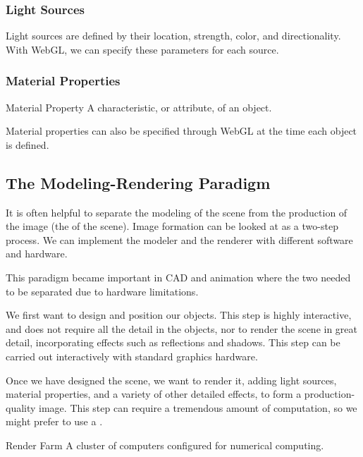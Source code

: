 \documentclass[\main/notes.tex]{subfiles}
\begin{document}
        \subsubsection{Light Sources}
          Light sources are defined by their location, strength, color, and directionality.
          With WebGL, we can specify these parameters for each source.

        \subsubsection{Material Properties}
          \begin{definition}{Material Property}
            A characteristic, or attribute, of an object.
          \end{definition}

          Material properties can also be specified through WebGL
          at the time each object is defined.

      \subsection{The Modeling-Rendering Paradigm}
        It is often helpful to separate the modeling of the scene
        from the production of the image
        (the  of the scene).
        Image formation can be looked at as a two-step process.
        We can implement the modeler and the renderer with different software and hardware.

        This paradigm became important in CAD and animation where
        the two needed to be separated due to hardware limitations.

        \begin{example}
          We first want to design and position our objects.
          This step is highly interactive, and does not require all the detail in the objects,
          nor to render the scene in great detail,
          incorporating effects such as reflections and shadows.
          This step can be carried out interactively with standard graphics hardware.

          Once we have designed the scene, we want to render it,
          adding light sources, material properties, and a variety of other detailed effects,
          to form a production-quality image.
          This step can require a tremendous amount of computation,
          so we might prefer to use a .

          \begin{definition}{Render Farm}
            A cluster of computers configured for numerical computing.
          \end{definition}
        \end{example}
\end{document}
